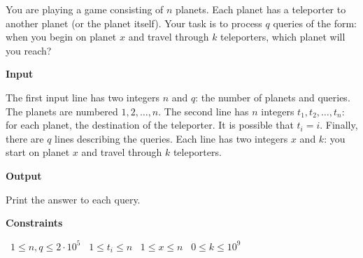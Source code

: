 You are playing a game consisting of $n$ planets. Each planet has a teleporter to another planet (or the planet itself).
Your task is to process $q$ queries of the form: when you begin on planet $x$ and travel through $k$ teleporters, which planet will you reach?

\vspace{0.3cm}\noindent\textbf{Input}

The first input line has two integers $n$ and $q$: the number of planets and queries. The planets are numbered $1,2,\dots,n$.
The second line has $n$ integers $t_1,t_2,\dots,t_n$: for each planet, the destination of the teleporter. It is possible that $t_i=i$.
Finally, there are $q$ lines describing the queries. Each line has two integers $x$ and $k$: you start on planet $x$ and travel through $k$ teleporters.

\vspace{0.3cm}\noindent\textbf{Output}

Print the answer to each query.

\vspace{0.3cm}\noindent\textbf{Constraints}

\textbullet\ $1 \le n, q \le 2 \cdot 10^5$
\textbullet\ $1 \le t_i \le n$
\textbullet\ $1 \le x \le n$
\textbullet\ $0 \le k \le 10^9$